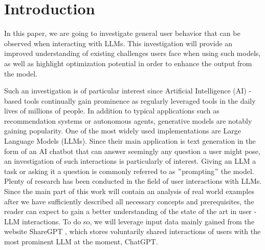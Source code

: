 
\section{Introduction}
\label{sec:introduction}

%
%
%



%
%
In this paper, we are going to investigate general user behavior that can be observed when interacting
with LLMs.
This investigation will provide an improved understanding of existing challenges users face when
using such models, as well as highlight optimization potential in order to enhance the output from
the model.

Such an investigation is of particular interest since Artificial Intelligence (AI) -based tools
continually gain prominence as regularly leveraged tools in the daily lives of millions of people.
In addition to typical applications such as recommendation systems or autonomous agents, generative
models are notably gaining popularity.
One of the most widely used implementations are Large Language Models (LLMs).
Since their main application is text generation in the form of an AI chatbot that can answer seemingly
any question a user might pose, an investigation of such interactions is particularly of interest.
Giving an LLM a task or asking it a question is commonly referred to as \("\)prompting\("\) the model.
Plenty of research has been conducted in the field of user interactions with LLMs.
Since the main part of this work will contain an analysis of real world examples after we have
sufficiently described all necessary concepts and prerequisites, the reader can expect to gain a better
understanding of the state of the art in user - LLM interactions.
To do so, we will leverage input data mainly gained from the website ShareGPT %
, which stores voluntarily shared interactions of users with the most prominent LLM at the moment,
ChatGPT. %
